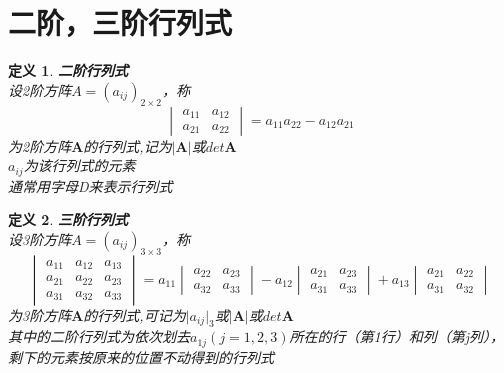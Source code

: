 \documentclass[a4paper]{ctexbook}
\newtheorem{definition}{定义}[section]
\begin{document}
\section{二阶，三阶行列式}
\begin{definition}
    \textbf{二阶行列式}
    \\设2阶方阵\(A=(a_{ij})_{2\times 2}\)，称
    \[\begin{vmatrix}
        a_{11}&a_{12}
        \\a_{21}&a_{22}
    \end{vmatrix}=a_{11}a_{22}-a_{12}a_{21}\]
    为2阶方阵\(\mathbf{A}\)的行列式,记为\(\rvert\mathbf{A}\rvert\)或\(det{\mathbf{A}}\)
    \\ \(a_{ij}\)为该行列式的元素
    \\通常用字母D来表示行列式
\end{definition}
\begin{definition}
    \textbf{三阶行列式}
    \\设3阶方阵\(A=(a_{ij})_{3\times 3}\)，称
    \[\begin{vmatrix}
        a_{11}&a_{12}&a_{13}
        \\a_{21}&a_{22}&a_{23}
        \\a_{31}&a_{32}&a_{33}
    \end{vmatrix}=a_{11}
    \begin{vmatrix}
        a_{22}&a_{23}
        \\a_{32}&a_{33}
    \end{vmatrix}-a_{12}
    \begin{vmatrix}
        a_{21}&a_{23}
        \\a_{31}&a_{33}
    \end{vmatrix}+a_{13}
    \begin{vmatrix}
        a_{21}&a_{22}
        \\a_{31}&a_{32}
    \end{vmatrix}\]
    为3阶方阵\(\mathbf{A}\)的行列式,可记为\(\rvert{a_{ij}}\rvert_3\)或\(\rvert\mathbf{A}\rvert\)或\(det{\mathbf{A}}\)
    \\其中的二阶行列式为依次划去\(a_{1j} (j=1,2,3)\)所在的行（第1行）和列（第j列），剩下的元素按原来的位置不动得到的行列式
\end{definition}
\end{document}
